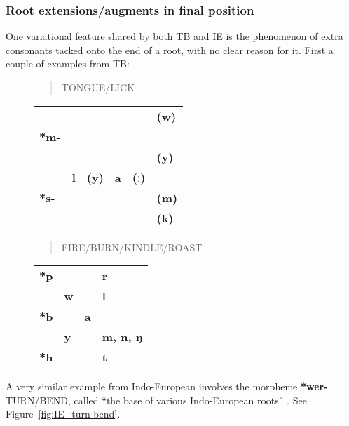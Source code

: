 	
\subsubsection{Root extensions/augments in final position}
One variational feature shared by both TB and IE is the phenomenon of extra consonants tacked onto the end of a root, with no clear reason for it. First a couple of examples from TB:

\begin{figure}[h!]
\begin{quote}TONGUE/LICK\end{quote}
\begin{center}
\begin{tabular}{l l l l l l}
 & & & & & \textbf{(w)}\\
\textbf{*m-} & & & & & \\
 & & & & & \textbf{(y)}\\
 & \textbf{l} & \textbf{(y)} & \textbf{a} & \textbf{(ː)} & \\	
\textbf{*s-} & & & & & \textbf{(m)}\\
 & & & & & \textbf{(k)}\\
\end{tabular}
\end{center}
\end{figure}

\begin{figure}[h!]
\begin{quote}FIRE/BURN/KINDLE/ROAST\end{quote}
\begin{center}
\begin{tabular}{l l l l}
\textbf{*p} & & & \textbf{r}\\
 & \textbf{w} & & \textbf{l}\\
\textbf{*b} & & \textbf{a} & \\	
 & \textbf{y} & & \textbf{m, n, ŋ}\\	
\textbf{*h} & & & \textbf{t}\\
\end{tabular}
\end{center}
\end{figure}

A very similar example from Indo-European involves the morpheme \textbf{*wer-} TURN/BEND, called “the base of various Indo-European roots” \citep[1549]{AHD}. See Figure~\ref{fig:IE_turn-bend}.

